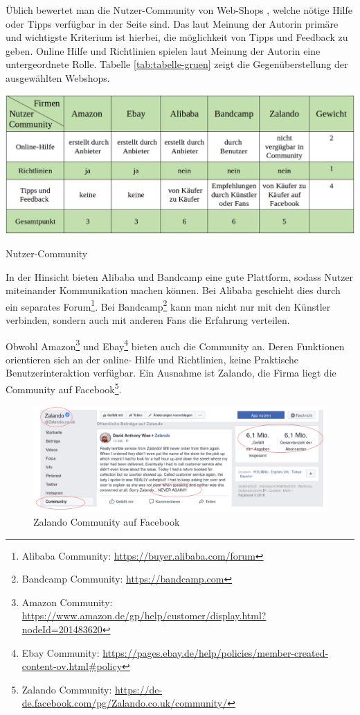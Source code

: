 Üblich bewertet man die Nutzer-Community von Web-Shops , welche nötige Hilfe oder Tipps verfügbar in der Seite sind. Das laut Meinung der Autorin primäre und wichtigste Kriterium ist hierbei, die möglichkeit von Tipps und Feedback zu geben. Online Hilfe und Richtlinien spielen laut Meinung der Autorin eine untergeordnete Rolle. Tabelle \vref{tab:tabelle-gruen} zeigt die Gegenüberstellung der ausgewählten Webshops.

\begin{table}[htbp]
	\centering
	\includegraphics[width=1\textwidth]{bilder/tabelle-gruen.png}
	\caption{Nutzer-Community}
	\label{tab:tabelle-gruen}
\end{table}

In der Hinsicht bieten Alibaba und Bandcamp eine gute Plattform, sodass Nutzer miteinander Kommunikation machen können. Bei Alibaba geschieht dies durch ein separates Forum\footnote{Alibaba Community: \url{https://buyer.alibaba.com/forum}}. Bei Bandcamp\footnote{ Bandcamp Community: \url{https://bandcamp.com}} kann man nicht nur mit den Künstler verbinden, sondern auch mit anderen Fans die Erfahrung verteilen.

Obwohl Amazon\footnote{Amazon Community: \url{https://www.amazon.de/gp/help/customer/display.html?nodeId=201483620}} und Ebay\footnote{Ebay Community: \url{https://pages.ebay.de/help/policies/member-created-content-ov.html\#policy}} bieten auch die Community an. Deren Funktionen orientieren sich an der online- Hilfe und Richtlinien, keine Praktische Benutzerinteraktion verfügbar. Ein Ausnahme ist Zalando, die Firma liegt die Community auf Facebook\footnote{Zalando Community: \url{https://de-de.facebook.com/pg/Zalando.co.uk/community/}}.

\begin{figure}[htbp]
	\centering
	\includegraphics[width=1\textwidth]{bilder/zalando-community.png}
	\caption{Zalando Community auf Facebook}
	\label{fig:zalando-community}
\end{figure}

